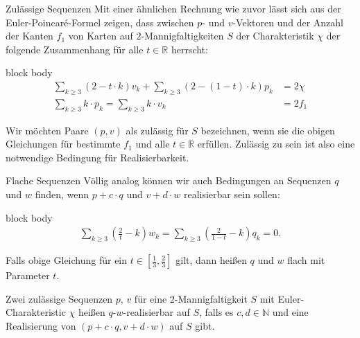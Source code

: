 \documentclass[10pt, notheorems]{beamer}
\newcommand{\nats}{\mathbb{N}}
\newcommand{\reals}{\mathbb{R}}
\newcommand{\hdef}[1]{\textcolor{darkred2}{#1}}
\begin{document}
\begin{frame}{Zulässige Sequenzen}
  Mit einer ähnlichen Rechnung wie zuvor lässt sich aus der {\sc Euler}-{\sc Poincaré}-Formel zeigen, dass zwischen $p$- und $v$-Vektoren und der Anzahl der Kanten $f_1$ von Karten auf $2$-Mannigfaltigkeiten $S$ der Charakteristik $\chi$ der folgende Zusammenhang für alle $t \in \reals$ herrscht:
  \begin{beamercolorbox}[sep=-10pt,center,shadow=true,rounded=true]{block body}
    \begin{align*}
      \sum_{k \geq 3} (2 - t \cdot k ) v_k + \sum_{k \geq 3} ( 2 - (1 - t) \cdot k ) p_k &= 2 \chi\\
      \sum_{k \geq 3} k \cdot p_k = \sum_{k \geq 3} k \cdot v_k &= 2f_1
    \end{align*}
  \end{beamercolorbox}
  Wir möchten Paare $(p, v)$ als \hdef{zulässig für $S$} bezeichnen, wenn sie die obigen Gleichungen für bestimmte $f_1$ und alle $t \in \reals$ erfüllen. Zulässig zu sein ist also eine notwendige Bedingung für Realisierbarkeit.
\end{frame}

\begin{frame}{Flache Sequenzen}
  Völlig analog können wir auch Bedingungen an Sequenzen $q$ und $w$ finden, wenn $p+c\cdot q$ und $v+d\cdot w$ realisierbar sein sollen:
  \begin{beamercolorbox}[sep=-10pt,center,shadow=true,rounded=true]{block body}
    \begin{align*}
      \sum_{k \geq 3} \left(\frac{2}{t} - k \right) w_k = \sum_{k \geq 3} \left( \frac{2}{1-t} - k \right) q_k = 0.
    \end{align*}
  \end{beamercolorbox}
  \pause
  Falls obige Gleichung für ein $t \in \left[\tfrac{1}{3}, \tfrac{2}{3}\right]$ gilt, dann heißen $q$ und $w$ \hdef{flach mit Parameter $t$}.
  \pause
  \begin{definition}
    Zwei zulässige Sequenzen $p$, $v$ für eine $2$-Mannigfaltigkeit $S$ mit {\sc Euler}-Charakteristic $\chi$ heißen \hdef{$q$-$w$-realisierbar auf $S$}, falls es $c, d \in \nats$ und eine Realisierung von $(p + c \cdot q, v + d \cdot w)$ auf $S$ gibt.
  \end{definition}
\end{frame}
\end{document}
